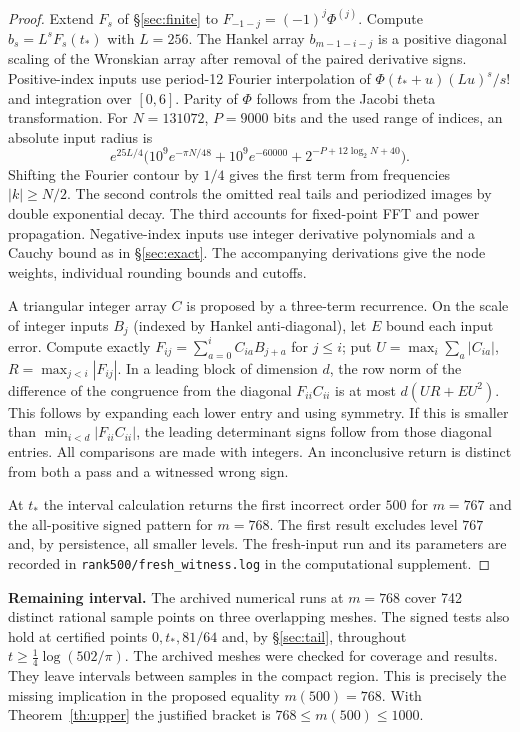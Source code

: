 \documentclass[11pt,a4paper,reqno]{amsart}
\numberwithin{equation}{section}
\begin{document}
\begin{proof}
Extend \(F_s\) of \S\ref{sec:finite} to \(F_{-1-j}=(-1)^j\Phi^{(j)}\). Compute \(b_s=L^sF_s(t_*)\) with \(L=256\). The Hankel array \(b_{m-1-i-j}\) is a positive diagonal scaling of the Wronskian array after removal of the paired derivative signs. Positive-index inputs use period-12 Fourier interpolation of \(\Phi(t_*+u)(Lu)^s/s!\) and integration over \([0,6]\). Parity of \(\Phi\) follows from the Jacobi theta transformation. For \(N=131072\), \(P=9000\) bits and the used range of indices, an absolute input radius is \[e^{25L/4}\big(10^9e^{-\pi N/48}+10^9e^{-60000}+2^{-P+12\log_2N+40}\big).\] Shifting the Fourier contour by \(1/4\) gives the first term from frequencies \(|k|\ge N/2\). The second controls the omitted real tails and periodized images by double exponential decay. The third accounts for fixed-point FFT and power propagation. Negative-index inputs use integer derivative polynomials and a Cauchy bound as in \S\ref{sec:exact}. The accompanying derivations give the node weights, individual rounding bounds and cutoffs.

A triangular integer array \(C\) is proposed by a three-term recurrence. On the scale of integer inputs \(B_j\) (indexed by Hankel anti-diagonal), let \(E\) bound each input error. Compute exactly \(F_{ij}=\sum_{a=0}^i C_{ia} B_{j+a}\) for \(j\le i\); put \(U=\max_i\sum_a|C_{ia}|\), \(R=\max_{j<i}|F_{ij}|\). In a leading block of dimension \(d\), the row norm of the difference of the congruence from the diagonal \(F_{ii}C_{ii}\) is at most \(d(UR+EU^2)\). This follows by expanding each lower entry and using symmetry. If this is smaller than \(\min_{i<d}|F_{ii}C_{ii}|\), the leading determinant signs follow from those diagonal entries. All comparisons are made with integers. An inconclusive return is distinct from both a pass and a witnessed wrong sign.

At \(t_*\) the interval calculation returns the first incorrect order \(500\) for \(m=767\) and the all-positive signed pattern for \(m=768\). The first result excludes level \(767\) and, by persistence, all smaller levels. The fresh-input run and its parameters are recorded in \texttt{rank500/fresh\_witness.log} in the computational supplement.
\end{proof}


\textbf{Remaining interval.} The archived numerical runs at \(m=768\) cover 742 distinct rational sample points on three overlapping meshes. The signed tests also hold at certified points \(0,t_*,81/64\) and, by \S\ref{sec:tail}, throughout \(t\ge\frac14\log(502/\pi)\). The archived meshes were checked for coverage and results. They leave intervals between samples in the compact region. This is precisely the missing implication in the proposed equality \(m(500)=768\). With Theorem~\ref{th:upper} the justified bracket is \(768\le m(500)\le1000\).
\end{document}
